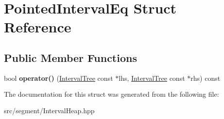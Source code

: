 \hypertarget{structPointedIntervalEq}{}\section{Pointed\+Interval\+Eq Struct Reference}
\label{structPointedIntervalEq}
\subsection*{Public Member Functions}
\begin{DoxyCompactItemize}
\item 
\mbox{\label{structPointedIntervalEq_a7b7a516ad7ac59f83c4d0cfea3848fd0}} 
bool {\bfseries operator()} (\mbox{\hyperlink{classIntervalTree}{Interval\+Tree}} const $\ast$lhs, \mbox{\hyperlink{classIntervalTree}{Interval\+Tree}} const $\ast$rhs) const
\end{DoxyCompactItemize}


The documentation for this struct was generated from the following file\+:\begin{DoxyCompactItemize}
\item 
src/segment/Interval\+Heap.\+hpp\end{DoxyCompactItemize}
